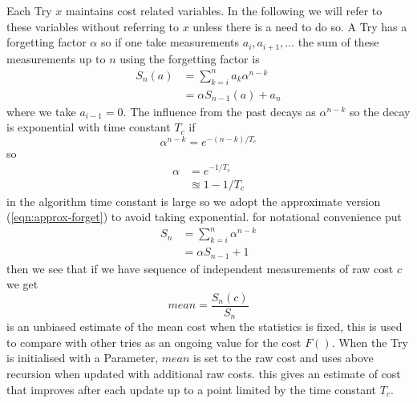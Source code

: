 \documentclass[a4paper,oneside,english]{book}
\numberwithin{equation}{section}
\numberwithin{figure}{section}
\begin{document}
Each Try $  x $ maintains cost related variables. In the following we will refer to these variables  without referring to $x$ unless there is a need to do so. A Try has a forgetting factor $\alpha$ so if one  take measurements $ a_i, a_{i+1}, \dots $ the sum of these measurements up to $n$ using the forgetting factor is 
\begin{align}
	S_n(a) &= \sum_{k=i}^{n} a_k \alpha^{n-k} \\
	&= \alpha S_{n-1}(a)+a_n
\end{align}     
 where we take $a_{i-1}=0$. The influence from the past decays as $\alpha^{n-k}$ so the decay is exponential with time constant $T_c$ if 
 \begin{equation}\label{key}
 	\alpha^{n-k} = e^{-(n-k)/T_c}
 \end{equation}
so 
\begin{align}
	\alpha &= e^{-1/T_c}\\
			&\approxeq 1-1/T_c \label{eqn:approx-forget}
\end{align}
in the algorithm  time constant is large so we adopt the approximate version (\ref{eqn:approx-forget}) to avoid taking exponential. for notational convenience put 
\begin{align}
	S_n &= \sum_{k=i}^{n}  \alpha^{n-k} \\
	&= \alpha S_{n-1}+1
\end{align}     
then we see that if we have sequence of independent measurements of raw cost $c$ we get 
\begin{equation}\label{key}
	mean = \frac{S_n(c)}{S_n}
\end{equation}
is an unbiased estimate of the mean cost when the statistics is fixed, this is used to compare with other tries as an ongoing value for the cost $ F() $. When the Try  is initialised with a Parameter, $mean$ is set to the raw cost and uses above recursion when updated with additional raw costs. this gives an estimate of cost that improves after each update up to a point limited by the time constant $T_c$.   
\end{document}
